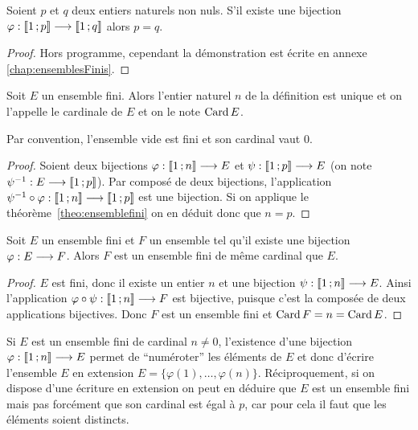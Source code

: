 \begin{theo}
  \label{theo:ensemblefini}
  Soient \(p\) et \(q\) deux entiers naturels non nuls. S'il existe une 
  bijection 
  \(\varphi:\mathopen{\llbracket}1\mathclose{}\mathpunct{};p\mathclose{\rrbracket} \longrightarrow \mathopen{\llbracket}1\mathclose{}\mathpunct{};q\mathclose{\rrbracket}\) 
  alors \(p = q\).
\end{theo}

\begin{proof}
  Hors programme, cependant la démonstration est écrite en annexe~
  \ref{chap:ensemblesFinis}.
\end{proof}

\begin{prop}[Définition]
  Soit \(E\) un ensemble fini. Alors l'entier naturel \(n\) de la définition 
  est unique et on l'appelle le cardinale de \(E\) et on le note \(\operatorname{Card} E\).
\end{prop}

Par convention, l'ensemble vide est fini et son cardinal vaut \(0\).

\begin{proof}
  Soient deux bijections \(\varphi:\mathopen{\llbracket}1\mathclose{}\mathpunct{};n\mathclose{\rrbracket} \longrightarrow E\) et 
  \(\psi:\mathopen{\llbracket}1\mathclose{}\mathpunct{};p\mathclose{\rrbracket} \longrightarrow E\) (on note 
  \(\psi^{-1}:E \longrightarrow \mathopen{\llbracket}1\mathclose{}\mathpunct{};p\mathclose{\rrbracket}\)). Par composé de deux bijections, 
  l'application \(\psi^{-1}\circ 
  \varphi:\mathopen{\llbracket}1\mathclose{}\mathpunct{};n\mathclose{\rrbracket} \longrightarrow \mathopen{\llbracket}1\mathclose{}\mathpunct{};p\mathclose{\rrbracket}\) est une 
  bijection. Si on applique le théorème~\ref{theo:ensemblefini} on en déduit 
  donc que \(n = p\).
\end{proof}
\begin{prop}
  Soit \(E\) un ensemble fini et \(F\) un ensemble tel qu'il existe une 
  bijection \(\varphi:E \longrightarrow F\). Alors \(F\) est un ensemble fini de 
  même cardinal que \(E\).
\end{prop}
\begin{proof}
  \(E\) est fini, donc il existe un entier \(n\) et une bijection 
  \(\psi:\mathopen{\llbracket}1\mathclose{}\mathpunct{};n\mathclose{\rrbracket} \longrightarrow E\). Ainsi l'application 
  \(\varphi\circ\psi:\mathopen{\llbracket}1\mathclose{}\mathpunct{};n\mathclose{\rrbracket} \longrightarrow F\) est bijective, 
  puisque c'est la composée de deux applications bijectives. Donc \(F\) est un 
  ensemble fini et \(\operatorname{Card} F = n = \operatorname{Card} E\).
\end{proof}

Si \(E\) est un ensemble fini de cardinal \(n\neq 0\), l'existence d'une 
bijection \(\varphi:\mathopen{\llbracket}1\mathclose{}\mathpunct{};n\mathclose{\rrbracket} \longrightarrow E\) permet de 
``numéroter'' les éléments de \(E\) et donc d'écrire l'ensemble \(E\) en 
extension \(E = \{\varphi(1), \ldots, \varphi(n)\}\).
Réciproquement, si on dispose d'une écriture en extension on peut en déduire 
que \(E\) est un ensemble fini mais pas forcément que son cardinal est égal à 
\(p\), car pour cela il faut que les éléments soient distincts.

